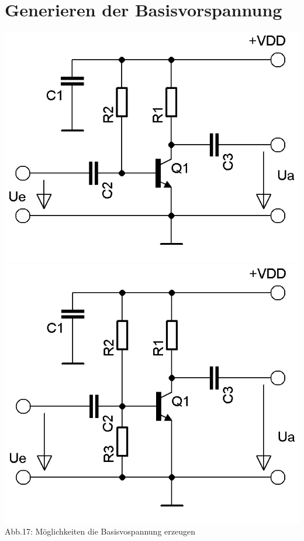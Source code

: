 \section*{Generieren der Basisvorspannung}
\begin{frame}
	\begin{center}
		\includegraphics[scale=0.8]{a06/Transistor-Verstaerker.png}
		\vspace{3mm}
		\includegraphics[scale=0.8]{a06/Transistor-Verstaerker-C.png}\\
		Abb.17: Möglichkeiten die Basisvospannung erzeugen 
	\end{center}
\end{frame}

